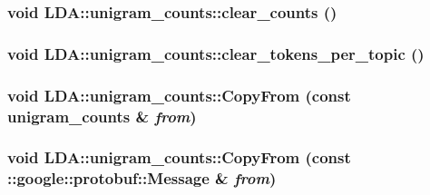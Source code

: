 \label{class_l_d_a_1_1unigram__counts_a96c7cf4b1e555f9ac14667e9cd3165d4}
\hypertarget{class_l_d_a_1_1unigram__counts_aea0e31ae0324bd76fa8fbf115de61149}{
\subsubsection[{clear\_\-counts}]{\setlength{\rightskip}{0pt plus 5cm}void LDA::unigram\_\-counts::clear\_\-counts ()}}
\label{class_l_d_a_1_1unigram__counts_aea0e31ae0324bd76fa8fbf115de61149}
\hypertarget{class_l_d_a_1_1unigram__counts_a94210b009cba49a77232f8a34a253d1b}{
\subsubsection[{clear\_\-tokens\_\-per\_\-topic}]{\setlength{\rightskip}{0pt plus 5cm}void LDA::unigram\_\-counts::clear\_\-tokens\_\-per\_\-topic ()}}
\label{class_l_d_a_1_1unigram__counts_a94210b009cba49a77232f8a34a253d1b}
\hypertarget{class_l_d_a_1_1unigram__counts_af3391d5bf23dbcc110811b1881b760d7}{
\subsubsection[{CopyFrom}]{\setlength{\rightskip}{0pt plus 5cm}void LDA::unigram\_\-counts::CopyFrom (const {\bf unigram\_\-counts} \& {\em from})}}
\label{class_l_d_a_1_1unigram__counts_af3391d5bf23dbcc110811b1881b760d7}
\hypertarget{class_l_d_a_1_1unigram__counts_ad4dc1f88526f6873ebc0ba70d2a2c347}{
\subsubsection[{CopyFrom}]{\setlength{\rightskip}{0pt plus 5cm}void LDA::unigram\_\-counts::CopyFrom (const ::google::protobuf::Message \& {\em from})}}
